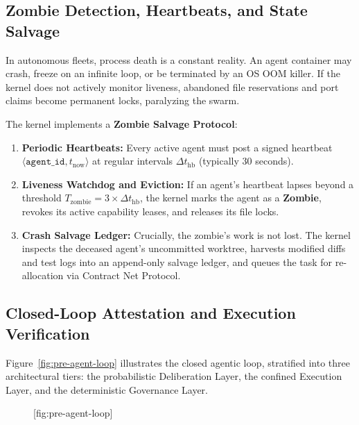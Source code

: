 \subsection{Zombie Detection, Heartbeats, and State Salvage}

In autonomous fleets, process death is a constant reality. An agent container may crash, freeze on an infinite loop, or be terminated by an OS OOM killer. If the kernel does not actively monitor liveness, abandoned file reservations and port claims become permanent locks, paralyzing the swarm.

The kernel implements a \textbf{Zombie Salvage Protocol}:
\begin{enumerate}[leftmargin=1.8em,itemsep=2pt]
  \item \textbf{Periodic Heartbeats:} Every active agent must post a signed heartbeat $\langle\mathtt{agent\_id}, t_{\text{now}}\rangle$ at regular intervals $\Delta t_{\text{hb}}$ (typically 30 seconds).
  \item \textbf{Liveness Watchdog and Eviction:} If an agent's heartbeat lapses beyond a threshold $T_{\text{zombie}} = 3 \times \Delta t_{\text{hb}}$, the kernel marks the agent as a \textbf{Zombie}, revokes its active capability leases, and releases its file locks.
  \item \textbf{Crash Salvage Ledger:} Crucially, the zombie's work is not lost. The kernel inspects the deceased agent's uncommitted worktree, harvests modified diffs and test logs into an append-only salvage ledger, and queues the task for re-allocation via Contract Net Protocol.
\end{enumerate}

\subsection{Closed-Loop Attestation and Execution Verification}

Figure~\ref{fig:pre-agent-loop} illustrates the closed agentic loop, stratified into three architectural tiers: the probabilistic Deliberation Layer, the confined Execution Layer, and the deterministic Governance Layer.

\begin{figure}[tp]
  \centering
  [fig:pre-agent-loop]
\end{figure}

